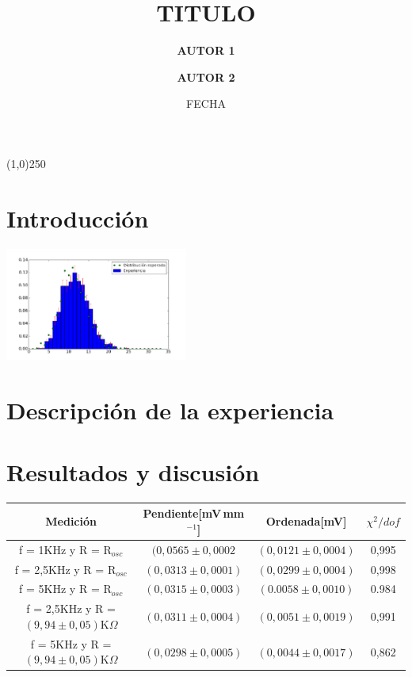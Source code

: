 \documentclass[10pt,a4paper]{article}
\title{\Huge \bfseries TITULO}
\author[1]{\Large \bfseries AUTOR 1}
\author[1]{\Large \bfseries AUTOR 2}
\affil[1]{FILIACIÓN}
\date{FECHA}
\begin{document}
\maketitle
\begin{abstract}
\blindtext
\end{abstract}

\begin{center}
\line(1,0){250}
\end{center}
\vspace{1 mm}

\section{Introducción}
\begin{multicols}{2}
\blindmathpaper

\begin{center}
  \centering
  \includegraphics[width=0.45\textwidth]{proba_efectiva.png}
  \label{fig:IMAGEN}
\end{center}

\section{Descripción de la experiencia}
\blindtext[14]

\newpage
\section{Resultados y discusión}
\Blindtext

\end{multicols}


\begin{center}
    \begin{tabular}{c c c c}
    \toprule
    Medición & Pendiente[mV$\,$mm$^{-1}$] & Ordenada[mV] & $\chi^2/dof$\\
    \midrule
    f = 1KHz y R = R$_{osc}$ & $(0,0565\pm0,0002$ & $(0,0121\pm0,0004)$ & 0,995\\
    f = 2,5KHz y R = R$_{osc}$ & $(0,0313\pm0,0001)$ & $(0,0299\pm0,0004)$ &0,998\\
    f = 5KHz y R = R$_{osc}$ &  $(0,0315\pm0,0003)$ & $(0.0058\pm0,0010)$ &0.984\\
    f = 2,5KHz y R = $(9,94\pm0,05)$K$\Omega$ &  $(0,0311\pm0,0004)$ & $(0,0051\pm0,0019)$ &0,991\\
    f = 5KHz y R = $(9,94\pm0,05)$K$\Omega$& $(0,0298\pm0,0005)$ & $(0,0044\pm0,0017)$ &0,862\\
    \bottomrule
    \end{tabular}
    \label{tbl:DATOS}
\end{center}
\end{document}
